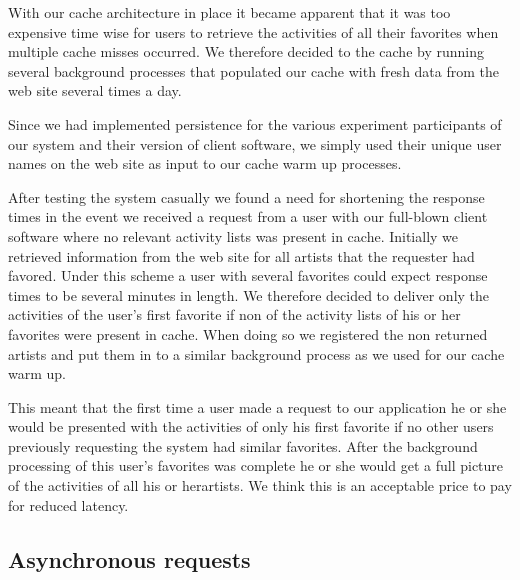 With our cache architecture in place it became apparent that it was too
expensive time wise for users to retrieve the activities of all their
favorites when multiple cache misses occurred. We therefore decided to
 the cache by running several background processes that populated
our cache with fresh data from the \urort{} web site several times a day.

Since we had implemented persistence for the various experiment participants
of our system
and their version of client software, we simply used their unique user names
on the \urort{} web site as input to our cache warm up processes.

After testing the system casually we found a need for shortening the response
times in the event we received a request from a user with our full-blown
client software where no relevant activity lists
was present in cache. Initially we retrieved information from the \urort{} web
site for all artists that the requester had favored. Under this scheme a
user with several favorites could expect response times to be several minutes
in length. We therefore decided to deliver only the activities of the user's
first favorite if non of the activity lists of his or her favorites were
present in cache. When doing so we registered the non returned artists and put
them in to a similar background process as we used for our cache warm up. 

This meant that the first time a user made a request to our application he
or she would be presented with the activities of only his first favorite if no
other users previously requesting the system had similar favorites. After the
background processing of this user's favorites was complete he or she
would get a full picture of the activities of all his or herartists.
We think this is an acceptable price to pay for reduced latency.

\subsection{Asynchronous requests}

